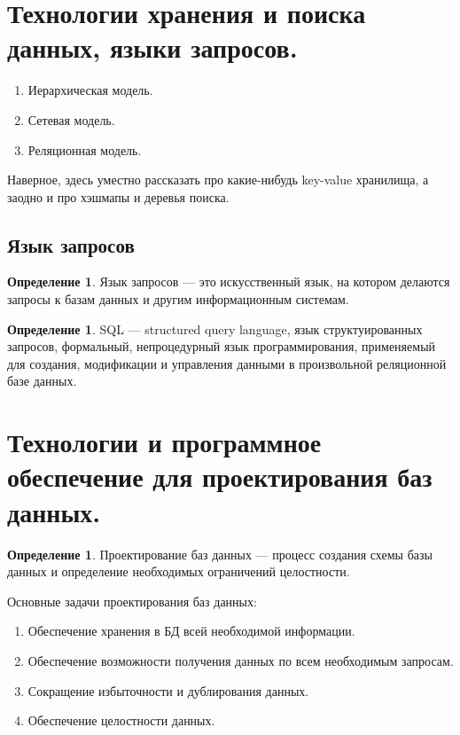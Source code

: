 \documentclass[12pt]{report}
\theoremstyle{definition}
\newtheorem{definition}[theorem]{Определение}
\begin{document}


\section{Технологии хранения и поиска данных, языки запросов.}

\begin{enumerate}
\item Иерархическая модель.
\item Сетевая модель.
\item Реляционная модель.
\end{enumerate}

Наверное, здесь уместно рассказать про какие-нибудь key-value хранилища,
а заодно и про хэшмапы и деревья поиска.

\subsection{Язык запросов}

\begin{definition}
Язык запросов --- это искусственный язык, на котором делаются запросы к базам
данных и другим информационным системам.
\end{definition}

\begin{definition}
SQL --- structured query language, язык структуированных запросов, формальный, непроцедурный
язык программирования, применяемый для создания, модификации и управления данными в произвольной
реляционной базе данных.
\end{definition}


\section{Технологии и программное обеспечение для проектирования баз данных.}

\begin{definition}
Проектирование баз данных --- процесс создания схемы базы данных и определение
необходимых ограничений целостности.
\end{definition}

Основные задачи проектирования баз данных:
\begin{enumerate}
\item Обеспечение хранения в БД всей необходимой информации.
\item Обеспечение возможности получения данных по всем необходимым запросам.
\item Сокращение избыточности и дублирования данных.
\item Обеспечение целостности данных.
\end{enumerate}
\end{document}
